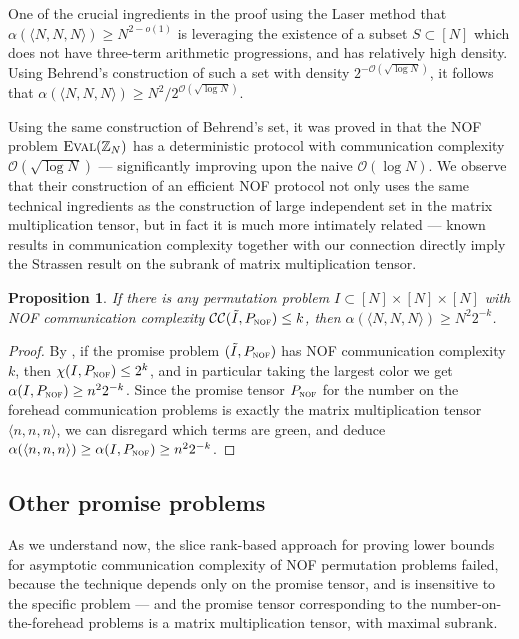 \documentclass[10pt,a4paper]{article}
\newtheorem{proposition}[theorem]{Proposition}
\newcommand{\bZ}{\mathbb{Z}}
\newcommand{\eval}{\textsc{Eval}}
\newcommand{\Oh}{\mathcal{O}}
\newcommand{\cc}{\mathcal{CC}}
\newcommand{\mmP}{P_{\textsc{nof}}}
\newcommand{\inprod}[1]{\langle #1 \rangle}
\begin{document}
One of the crucial ingredients in the proof using the Laser method that $\alpha(\inprod{N,N,N}) \geq N^{2 - o(1)}$ is leveraging the existence of a subset $S \subset [N]$ which does not have three-term arithmetic progressions, and has relatively high density. Using Behrend's \cite{behrend} construction of such a set with density $2^{-\Oh(\sqrt{\log N})}$, it follows that $\alpha(\inprod{N,N,N}) \geq N^2/2^{\Oh(\sqrt{\log  N})}$.

Using the same construction of Behrend's set, it was proved in \cite{CFL83} that the NOF problem $\eval(\bZ_N)$ has a deterministic protocol with communication complexity $\Oh(\sqrt{\log N})$ --- significantly improving upon the naive $\Oh(\log N)$. We observe that their construction of an efficient NOF protocol not only uses the same technical ingredients as the construction of large independent set in the matrix multiplication tensor, but in fact it is much more intimately related --- known results in communication complexity together with our connection directly imply the Strassen result on the subrank of matrix multiplication tensor.

\begin{proposition}
\label{fct:qzo-lb}
If there is any permutation problem $I \subset [N]\times [N] \times [N]$ with NOF communication complexity $\cc(\tilde{I}, \mmP) \leq k$, then $\alpha(\inprod{N,N,N}) \geq N^{2} 2^{-k}$.
\end{proposition}
\begin{proof}
    By , if the promise problem $(\tilde{I}, \mmP)$ has NOF communication complexity $k$, then $\chi(I, \mmP) \leq 2^k$, and in particular taking the largest color we get $\alpha(I, \mmP) \geq n^{2} 2^{-k}$. Since the promise tensor $\mmP$ for the number on the forehead communication problems is exactly the matrix multiplication tensor $\inprod{n,n,n}$, we can disregard which terms are green, and deduce $\alpha(\inprod{n,n,n}) \geq \alpha(I, \mmP) \geq n^2 2^{-k}$.
\end{proof}

\subsection{Other promise problems}
As we understand now, the slice rank-based approach for proving lower bounds for asymptotic communication complexity of NOF permutation problems failed, because the technique depends only on the promise tensor, and is insensitive to the specific problem --- and the promise tensor corresponding to the number-on-the-forehead problems is a matrix multiplication tensor, with maximal subrank.
\end{document}
